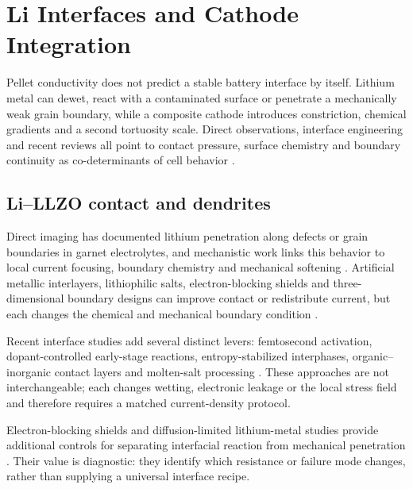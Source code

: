 \section{Li Interfaces and Cathode Integration}
\label{sec:interfaces}

Pellet conductivity does not predict a stable battery interface by itself. Lithium metal can dewet, react with a contaminated surface or penetrate a mechanically weak grain boundary, while a composite cathode introduces constriction, chemical gradients and a second tortuosity scale. Direct observations, interface engineering and recent reviews all point to contact pressure, surface chemistry and boundary continuity as co-determinants of cell behavior \cite{wang2020garnet,wang2024review,zhao2024review}.

\subsection{Li--LLZO contact and dendrites}

Direct imaging has documented lithium penetration along defects or grain boundaries in garnet electrolytes, and mechanistic work links this behavior to local current focusing, boundary chemistry and mechanical softening \cite{ren2015direct,yu2018grain,counihan2023understanding,chen2024dendrite,hua2023dendrite}. Artificial metallic interlayers, lithiophilic salts, electron-blocking shields and three-dimensional boundary designs can improve contact or redistribute current, but each changes the chemical and mechanical boundary condition \cite{cui2022melt,cai2022in,du2021smart,du2024constructing,zheng2023high}.

Recent interface studies add several distinct levers: femtosecond activation, dopant-controlled early-stage reactions, entropy-stabilized interphases, organic--inorganic contact layers and molten-salt processing \cite{zhang2026femtosecond,jeong2026dopant,giri2026entropy,feng2026interface,kang2026reducing}. These approaches are not interchangeable; each changes wetting, electronic leakage or the local stress field and therefore requires a matched current-density protocol.

Electron-blocking shields and diffusion-limited lithium-metal studies provide additional controls for separating interfacial reaction from mechanical penetration \cite{huo2021a,krauskopf2019diffusion}. Their value is diagnostic: they identify which resistance or failure mode changes, rather than supplying a universal interface recipe.

